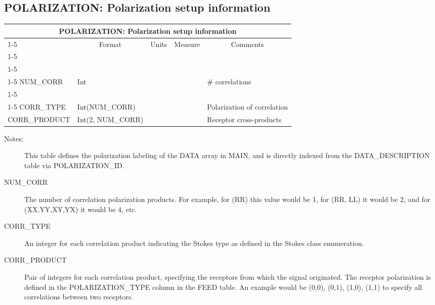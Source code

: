 \documentclass{article}
\newcommand{\defline}[1]{\cline{1-5}
\multicolumn{5}{|l|}{#1} \\
\cline{1-5}}
\newcommand{\definetable}[2]
{
	\vfill\newpage
	\subsection{#1}
        \vspace{0.15in}
        \small
	\begin{tabular}{|l|p{1.25in}|l|p{.9in}|p{1.4in}|}
	\hline
	\multicolumn{5}{|c|}{\bf #1}\\ 
	\cline{1-5}
        \multicolumn{1}{|c|}{Name}&\multicolumn{1}{|c|}{Format}&
        \multicolumn{1}{|c|}{Units}&\multicolumn{1}{|c|}{Measure}&
        \multicolumn{1}{|c|}{Comments}\\
        \cline{1-5}
        #2
        \hline
	\end{tabular}
}
\begin{document}
\definetable{POLARIZATION: Polarization setup information}{
\defline{\bf Columns}
\defline{\em Data description columns}
NUM\_CORR   &     Int  &           &        & \# correlations\\
\defline{\em Data}  
CORR\_TYPE & Int(NUM\_CORR) & & & Polarization of correlation \\
CORR\_PRODUCT &  Int(2, NUM\_CORR) &  & & Receptor cross-products \\  
}
\begin{description}

\item[Notes:] This table defines the polarization labeling of the DATA
array in MAIN, and is directly indexed from the DATA\_DESCRIPTION
table via POLARIZATION\_ID.

\item[NUM\_CORR] The number of correlation polarization products. For
example, for (RR) this value would be 1, for (RR, LL) it would be 2,
and for (XX,YY,XY,YX) it would be 4, etc.

\item[CORR\_TYPE] An integer for each correlation product indicating
the Stokes type as defined in the Stokes class enumeration.

\item[CORR\_PRODUCT] Pair of integers for each correlation product,
specifying the receptors from which the signal originated.  The
receptor polarization is defined in the POLARIZATION\_TYPE column in
the FEED table. An example would be (0,0), (0,1), (1,0), (1,1) to
specify all correlations between two receptors.

\end{description}
\end{document}
